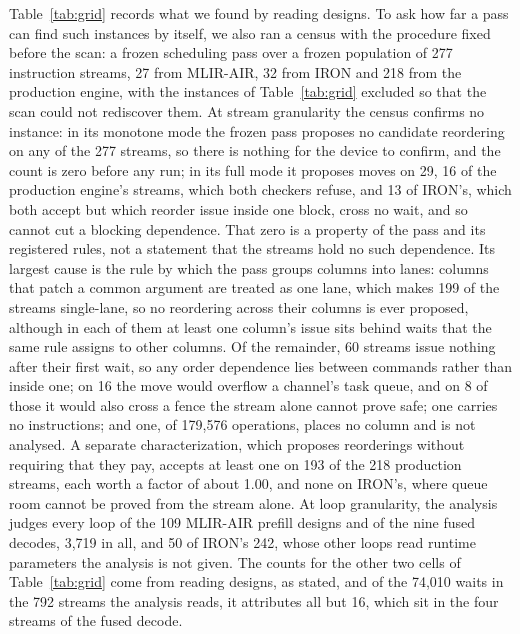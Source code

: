 Table~\ref{tab:grid} records what we found by reading designs. To ask how far a pass can find such instances by itself, we also ran a census with the procedure fixed before the scan: a frozen scheduling pass over a frozen population of 277 instruction streams, 27 from MLIR-AIR, 32 from IRON and 218 from the production engine, with the instances of Table~\ref{tab:grid} excluded so that the scan could not rediscover them.
At stream granularity the census confirms no instance: in its monotone mode the frozen pass proposes no candidate reordering on any of the 277 streams, so there is nothing for the device to confirm, and the count is zero before any run; in its full mode it proposes moves on 29, 16 of the production engine's streams, which both checkers refuse, and 13 of IRON's, which both accept but which reorder issue inside one block, cross no wait, and so cannot cut a blocking dependence.
That zero is a property of the pass and its registered rules, not a statement that the streams hold no such dependence.
Its largest cause is the rule by which the pass groups columns into lanes: columns that patch a common argument are treated as one lane, which makes 199 of the streams single-lane, so no reordering across their columns is ever proposed, although in each of them at least one column's issue sits behind waits that the same rule assigns to other columns.
Of the remainder, 60 streams issue nothing after their first wait, so any order dependence lies between commands rather than inside one; on 16 the move would overflow a channel's task queue, and on 8 of those it would also cross a fence the stream alone cannot prove safe; one carries no instructions; and one, of 179{,}576 operations, places no column and is not analysed.
A separate characterization, which proposes reorderings without requiring that they pay, accepts at least one on 193 of the 218 production streams, each worth a factor of about 1.00, and none on IRON's, where queue room cannot be proved from the stream alone.
At loop granularity, the analysis judges every loop of the 109 MLIR-AIR prefill designs and of the nine fused decodes, 3{,}719 in all, and 50 of IRON's 242, whose other loops read runtime parameters the analysis is not given.
The counts for the other two cells of Table~\ref{tab:grid} come from reading designs, as stated, and of the 74{,}010 waits in the 792 streams the analysis reads, it attributes all but 16, which sit in the four streams of the fused decode.
